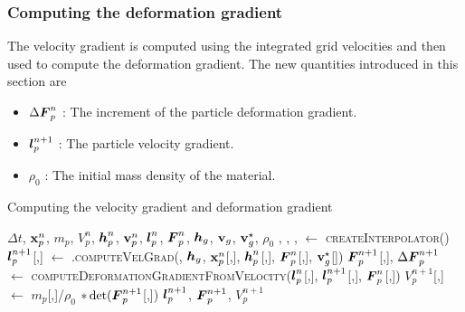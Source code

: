 \subsubsection{Computing the deformation gradient}
The velocity gradient is computed using the integrated grid velocities and then used to 
compute the deformation gradient. The new quantities introduced in this section are
\begin{itemize} 
  \setlength\itemsep{1pt}
  \item $\Delta\boldsymbol{F}_{p}^n$ : {\Ochre The increment of the particle deformation gradient.}
  \item $\boldsymbol{l}_p^{n+1}$ : {\Ochre The particle velocity gradient.}
  \item $\rho_0$ : {\Ochre The initial mass density of the material.}
\end{itemize}
\begin{breakablealgorithm}
  \caption{Computing the velocity gradient and deformation gradient}
  \begin{algorithmic}[1]
    \Require $\Delta t$, $\mathbf{x}_p^n$, $m_p$, $V_p^n$, $\boldsymbol{h}_p^n$, $\mathbf{v}_p^n$, $\boldsymbol{l}_p^n$, $\boldsymbol{F}_p^n$,
             $\boldsymbol{h}_g$, $\mathbf{v}_g$, $\mathbf{v}_g^\star$, $\rho_0$
             , ,
             , 
      \State {} $\leftarrow$ \textsc{createInterpolator}()
          \State $\boldsymbol{l}_p^{n+1}$[\TTmatl,\TTpart] $\leftarrow$ 
           .\textsc{computeVelGrad}(,
            $\boldsymbol{h}_g$, $\mathbf{x}_p^n$[\TTmatl,\TTpart], \WWRP
            $\boldsymbol{h}_p^n$[\TTmatl,\TTpart], $\boldsymbol{F}_p^n$[\TTmatl,\TTpart], 
            $\mathbf{v}_g^\star$[\TTmatl])
          \State $\boldsymbol{F}_p^{n+1}$[\TTmatl,\TTpart], $\Delta \boldsymbol{F}_p^{n+1}$ $\leftarrow$ 
            \textsc{computeDeformationGradientFromVelocity}($\boldsymbol{l}_p^n$[\TTmatl,\TTpart], \WWRP
            $\boldsymbol{l}_p^{n+1}$[\TTmatl,\TTpart], $\boldsymbol{F}_p^n$[\TTmatl,\TTpart])
          \State $V_p^{n+1}$[\TTmatl,\TTpart] $\leftarrow$ $m_p$[\TTmatl,\TTpart]/$\rho_0$ 
            $*\det(\boldsymbol{F}_p^{n+1}$[\TTmatl,\TTpart])
        \EndFor
      \EndFor
      \State \Return $\boldsymbol{l}_p^{n+1}$, $\boldsymbol{F}_p^{n+1}$, $V_p^{n+1}$
    \EndProcedure
  \end{algorithmic}
\end{breakablealgorithm}

